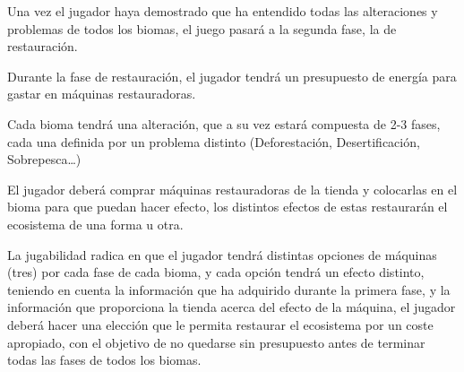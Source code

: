 Una vez el jugador haya demostrado que ha entendido todas las alteraciones y problemas de todos los biomas, el juego pasará a la segunda fase, la de restauración.
\begin{compactitem}
    \item Durante la fase de restauración, el jugador tendrá un presupuesto de energía para gastar en máquinas restauradoras.
    \item Cada bioma tendrá una alteración, que a su vez estará compuesta de 2-3 fases, cada una definida por un problema distinto (Deforestación, Desertificación, Sobrepesca…)
    \item El jugador deberá comprar máquinas restauradoras de la tienda y colocarlas en el bioma para que puedan hacer efecto, los distintos efectos de estas restaurarán el ecosistema de una forma u otra.
    \item La jugabilidad radica en que el jugador tendrá distintas opciones de máquinas (tres) por cada fase de cada bioma, y cada opción tendrá un efecto distinto, teniendo en cuenta la información que ha adquirido durante la primera fase, y la información que proporciona la tienda acerca del efecto de la máquina, el jugador deberá hacer una elección que le permita restaurar el ecosistema por un coste apropiado, con el objetivo de no quedarse sin presupuesto antes de terminar todas las fases de todos los biomas.
\end{compactitem}

